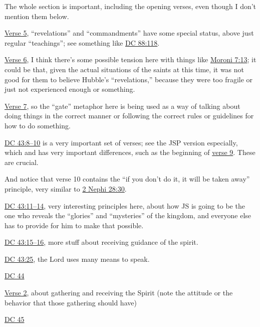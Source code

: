 \begin{compactdesc}
\begin{compactitem}
					\item The whole section is important, including the opening verses, even though I don't mention them below.
					\item \hyperref[DC43-5]{Verse 5}, ``revelations'' and ``commandments'' have some special status, above just regular ``teachings''; see something like \hyperref[DC88-118]{DC 88:118}.
					\item \hyperref[DC43-6]{Verse 6}, I think there's some possible tension here with things like \hyperref[MORONI-7-13]{Moroni 7:13}; it could be that, given the actual situations of the saints at this time, it was not good for them to believe Hubble's ``revelations,'' because they were too fragile or just not experienced enough or something.
					\item \hyperref[DC43-7]{Verse 7}, so the ``gate'' metaphor here is being used as a way of talking about doing things in the correct manner or following the correct rules or guidelines for how to do something.
					\item \hyperref[DC43-8]{DC 43:8--10} is a very important set of verses; see the JSP version especially, which and has very important differences, such as the beginning of \hyperref[DC43-9]{verse 9}. These are crucial.
					\item And notice that verse 10 contains the ``if you don't do it, it will be taken away'' principle, very similar to \hyperref[2NEPHI-28-30]{2 Nephi 28:30}.
					\item \hyperref[DC43-11]{DC 43:11--14}, very interesting principles here, about how JS is going to be the one who reveals the ``glories'' and ``mysteries'' of the kingdom, and everyone else has to provide for him to make that possible.
					\item \hyperref[DC43-15]{DC 43:15--16}, more stuff about receiving guidance of the spirit.
					\item \hyperref[DC43-25]{DC 43:25}, the Lord uses many means to speak.
				\end{compactitem}
			\item \hyperref[DC44]{DC 44}
				\begin{compactitem}
					\item \hyperref[DC44-2]{Verse 2}, about gathering and receiving the Spirit (note the attitude or the behavior that those gathering should have)
				\end{compactitem}
			\item \hyperref[DC45]{DC 45}
				\begin{compactitem}

\end{compactitem}
\end{compactdesc}
